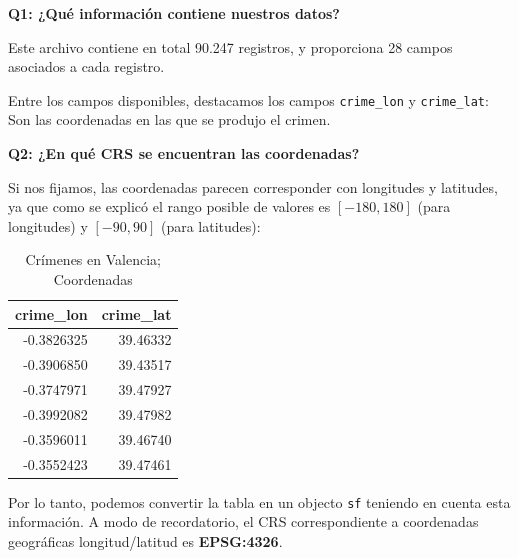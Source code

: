 \documentclass[
]{report}
\theoremstyle{definition}
\theoremstyle{definition}
\theoremstyle{definition}
\theoremstyle{definition}
\theoremstyle{remark}
\begin{document}
\textbf{Q1: ¿Qué información contiene nuestros datos?}

Este archivo contiene en total
90.247 registros, y
proporciona 28 campos asociados a cada registro.

Entre los campos disponibles, destacamos los campos \texttt{crime\_lon} y \texttt{crime\_lat}:
Son las coordenadas en las que se produjo el crimen.

\textbf{Q2: ¿En qué CRS se encuentran las coordenadas?}

Si nos fijamos, las coordenadas parecen corresponder con longitudes y latitudes,
ya que como se explicó el rango posible de valores es \([-180, 180]\) (para
longitudes) y \([-90, 90]\) (para latitudes):

\begin{table}

\caption{\label{tab:coods-lonlat}Crímenes en Valencia; Coordenadas}
\centering
\begin{tabular}[t]{r|r}
\hline
crime\_lon & crime\_lat\\
\hline
-0.3826325 & 39.46332\\
\hline
-0.3906850 & 39.43517\\
\hline
-0.3747971 & 39.47927\\
\hline
-0.3992082 & 39.47982\\
\hline
-0.3596011 & 39.46740\\
\hline
-0.3552423 & 39.47461\\
\hline
\end{tabular}
\end{table}

Por lo tanto, podemos convertir la tabla en un objecto \texttt{sf} teniendo en cuenta
esta información. A modo de recordatorio, el CRS correspondiente a coordenadas
geográficas longitud/latitud es \textbf{EPSG:4326}.
\end{document}
